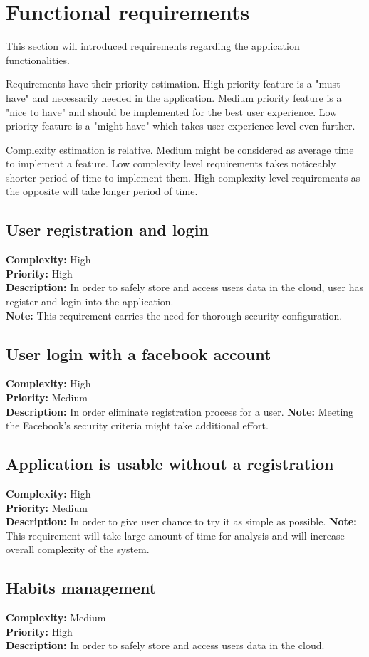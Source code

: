 
\section{Functional requirements}\label{sec:functional-requirements}

This section will introduced requirements regarding the application functionalities.

Requirements have their priority estimation.
High priority feature is a "must have" and necessarily needed in the application.
Medium priority feature is a "nice to have" and should be implemented for the best user experience.
Low priority feature is a "might have" which takes user experience level even further.

Complexity estimation is relative.
Medium might be considered as average time to implement a feature.
Low complexity level requirements takes noticeably shorter period of time to implement them.
High complexity level requirements as the opposite will take longer period of time.

\subsection{User registration and login}\label{subsec:user-registration-and-login}
\textbf{Complexity:} High\\
\textbf{Priority:} High\\
\textbf{Description:} In order to safely store and access users data in the cloud, user has register and login into the application.\\
\textbf{Note:} This requirement carries the need for thorough security configuration.


\subsection{User login with a facebook account}\label{subsec:user-login-with-facebook-account}
\textbf{Complexity:} High\\
\textbf{Priority:} Medium\\
\textbf{Description:} In order eliminate registration process for a user.
\textbf{Note:} Meeting the Facebook's security criteria might take additional effort.


\subsection{Application is usable without a registration}\label{subsec:application-is-usable-without-registration}
\textbf{Complexity:} High\\
\textbf{Priority:} Medium\\
\textbf{Description:} In order to give user chance to try it as simple as possible.
\textbf{Note:} This requirement will take large amount of time for analysis and will increase overall complexity of the system.


\subsection{Habits management}\label{subsec:habits-management}
\textbf{Complexity:} Medium\\
\textbf{Priority:} High\\
\textbf{Description:} In order to safely store and access users data in the cloud.
